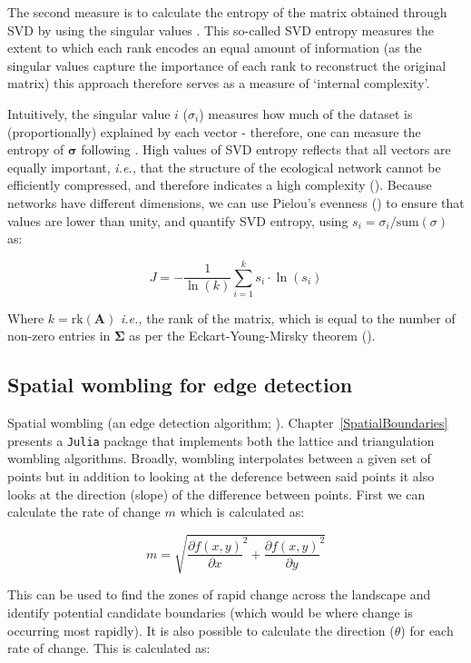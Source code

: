 \begin{refsection}
The second measure is to calculate the entropy of the matrix obtained through SVD by using the singular values \cite{Shannon1948MatThe}. This so-called SVD entropy measures the extent to which each rank encodes an equal amount of information (as the singular values capture the importance of each rank to reconstruct the original matrix) this approach therefore serves as a measure of `internal complexity'.

Intuitively, the singular value $i$ ($\sigma_i$) measures how much of the dataset is (proportionally) explained by each vector - therefore, one can measure the entropy of \(\mathbf{\sigma}\) following \cite{Shannon1948MatThe}. High values of SVD entropy reflects that all vectors are equally important, \emph{i.e.,} that the structure of the ecological network cannot be efficiently compressed, and therefore indicates a high complexity (\cite{Gu2016HowLon}). Because networks have different dimensions, we can use Pielou's evenness (\cite{Pielou1975EcoDiv}) to ensure that values are lower than unity, and quantify SVD entropy, using $s_i = \sigma_i/\text{sum}(\sigma)$ as:

$$J = -\frac{1}{\ln(k)}\sum_{i=1}^k s_i\cdot\ln(s_i)$$

Where \(k = \text{rk}(\mathbf{A})\) \emph{i.e.,} the rank of the matrix, which is equal to the number of non-zero entries in \(\mathbf{\Sigma}\) as per the Eckart-Young-Mirsky theorem (\cite{Eckart1936AppOne, Golub1987GenEck}). 

\subsection{Spatial wombling for edge detection}

Spatial wombling (an edge detection algorithm; \cite{Womble1951DifSys}). Chapter~\ref{SpatialBoundaries} presents a \texttt{Julia} package that implements both the lattice and triangulation wombling algorithms. Broadly, wombling interpolates between a given set of points but in addition to looking at the deference between said points it also looks at the direction (slope) of the difference between points. First we can calculate the rate of change \(m\) which is calculated as:

$$m = \sqrt{\frac{\partial f(x,y)}{\partial x}^2 + \frac{\partial
f(x,y)}{\partial y}^2}$$

This can be used to find the zones of rapid change across the landscape and identify potential candidate boundaries (which would be where change is occurring most rapidly). It is also possible to calculate the direction (\(\theta\)) for each rate of change. This is calculated as:


\end{refsection}
